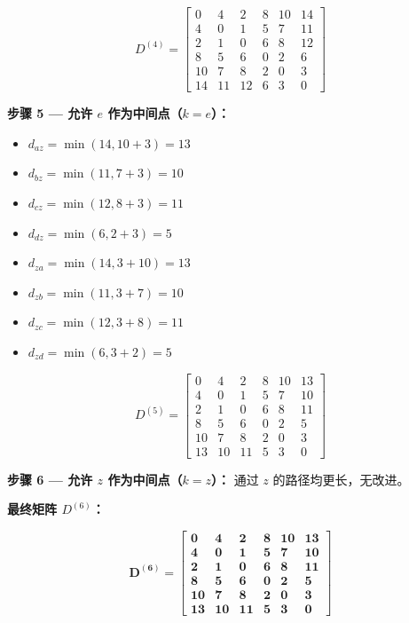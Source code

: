 \documentclass[11pt,UTF8]{article}
\begin{document}
\[
D^{(4)} = \begin{bmatrix}
0 & 4 & 2 & 8 & 10 & 14 \\
4 & 0 & 1 & 5 & 7 & 11 \\
2 & 1 & 0 & 6 & 8 & 12 \\
8 & 5 & 6 & 0 & 2 & 6 \\
10 & 7 & 8 & 2 & 0 & 3 \\
14 & 11 & 12 & 6 & 3 & 0
\end{bmatrix}
\]

\textbf{步骤 5 — 允许 $e$ 作为中间点（$k=e$）：}
\begin{itemize}
    \item $d_{az} = \min(14, 10+3) = 13$
    \item $d_{bz} = \min(11, 7+3) = 10$
    \item $d_{cz} = \min(12, 8+3) = 11$
    \item $d_{dz} = \min(6, 2+3) = 5$
    \item $d_{za} = \min(14, 3+10) = 13$
    \item $d_{zb} = \min(11, 3+7) = 10$
    \item $d_{zc} = \min(12, 3+8) = 11$
    \item $d_{zd} = \min(6, 3+2) = 5$
\end{itemize}

\[
D^{(5)} = \begin{bmatrix}
0 & 4 & 2 & 8 & 10 & 13 \\
4 & 0 & 1 & 5 & 7 & 10 \\
2 & 1 & 0 & 6 & 8 & 11 \\
8 & 5 & 6 & 0 & 2 & 5 \\
10 & 7 & 8 & 2 & 0 & 3 \\
13 & 10 & 11 & 5 & 3 & 0
\end{bmatrix}
\]

\textbf{步骤 6 — 允许 $z$ 作为中间点（$k=z$）：}
通过 $z$ 的路径均更长，无改进。

\textbf{最终矩阵 $D^{(6)}$：}

\[
\mathbf{D^{(6)} = \begin{bmatrix}
0 & 4 & 2 & 8 & 10 & 13 \\
4 & 0 & 1 & 5 & 7 & 10 \\
2 & 1 & 0 & 6 & 8 & 11 \\
8 & 5 & 6 & 0 & 2 & 5 \\
10 & 7 & 8 & 2 & 0 & 3 \\
13 & 10 & 11 & 5 & 3 & 0
\end{bmatrix}}
\]
\end{document}
